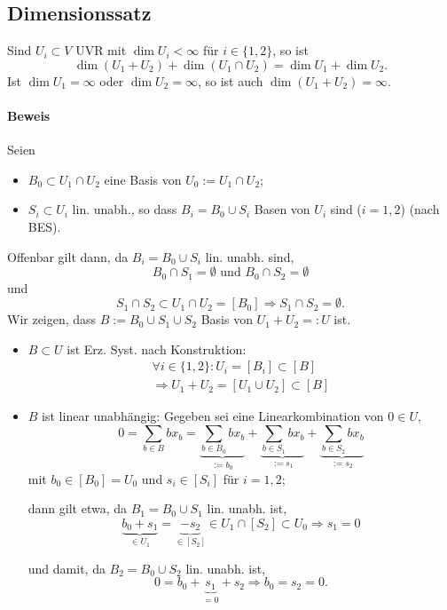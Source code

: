  \subsection{Dimensionssatz}
 	\begin{Satz}[Dimensionssatz]
 		Sind $ U_i \subset V $ UVR mit $ \dim U_i < \infty $ für $ i\in \{1,2\} $, so ist
 		\[
 			\dim (U_1+U_2) + \dim (U_1\cap U_2) = \dim U_1 + \dim U_2.
 		\]
 		Ist $ \dim U_1 = \infty$ oder $ \dim U_2=\infty $, so ist auch $ \dim (U_1+U_2)=\infty $.
 	\end{Satz}

 	\paragraph{Beweis}
 		Seien
 		\begin{itemize}
 			\item $ B_0 \subset U_1\cap U_2 $ eine Basis von $ U_0 := U_1\cap U_2 $;
 			\item $ S_i \subset U_i $ lin. unabh., so dass $ B_i = B_0 \cup S_i $ Basen von $ U_i $ sind ($ i = 1,2 $) (nach BES).
 		\end{itemize}
 		Offenbar gilt dann, da $ B_i = B_0\cup S_i $ lin. unabh. sind,
 		\[
 			B_0\cap S_1 = \emptyset \text{ und } B_0\cap S_2 = \emptyset
 		\]
 		und
 		\[
 			S_1\cap S_2 \subset U_1\cap U_2 = [B_0] \Rightarrow S_1\cap S_2 = \emptyset.
 		\]
 		Wir zeigen, dass $ B:= B_0\cup S_1\cup S_2 $ Basis von $ U_1 + U_2 =: U $ ist.
 		\begin{itemize}
 			\item	$ B\subset U $ ist Erz. Syst. nach Konstruktion:
 			      \begin{gather*}
 			      	\forall i\in \{1,2\} : U_i=[B_i]\subset [B]\\
 			      	\Rightarrow U_1+U_2 = [U_1\cup U_2]\subset [B]
 			      \end{gather*}

 			\item $ B $ ist linear unabhängig:
 			      Gegeben sei eine Linearkombination von $ 0\in U $,
 			      \[
 			      	0 = \sum_{b\in B}bx_b = \underbrace{\sum_{b\in B_0}bx_b}_{:=b_0} + \underbrace{\sum_{b\in S_1}bx_b}_{:=s_1} + \underbrace{\sum_{b\in S_2}bx_b}_{:=s_2}
 			      \]
 			      mit $b_0\in [B_0] = U_0$ und $s_i\in [S_i]$ für $i= 1,2$;

 			      dann gilt etwa, da $ B_1 = B_0 \cup S_1 $ lin. unabh. ist,
 			      \[
 			      	\underbrace{b_0+ s_1}_{\in U_1} = \underbrace{-s_2}_{\in [S_2]} \in U_1\cap [S_2]\subset U_0 \Rightarrow s_1 = 0
 			      \]

 			      und damit, da $ B_2 = B_0 \cup S_2 $ lin. unabh. ist,
 			      \[
 			      	0 = b_0 + \underbrace{s_1}_{=0} + s_2 \Rightarrow b_0=s_2 = 0.
 			      \]
 		\end{itemize}
